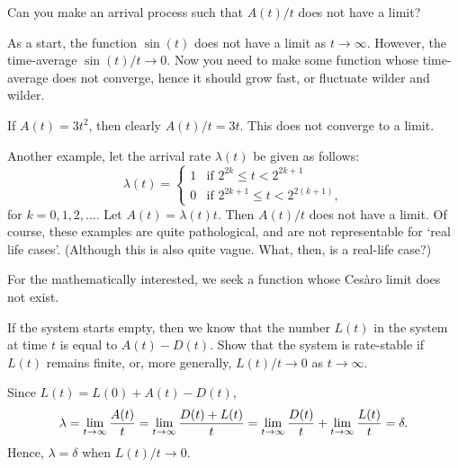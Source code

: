 \begin{exercise}
  Can you make an arrival process such that $A(t)/t$ does not have a limit?
\begin{hint}
  As a start, the function $\sin(t)$ does not have a limit as $t\to\infty$.
  However, the time-average $\sin(t)/t \to 0$.
  Now you need to make some function whose time-average does not converge, hence it should grow fast, or fluctuate wilder and wilder.
\end{hint}
\begin{solution}
 If $A(t) = 3 t^2$, then clearly $A(t)/t = 3t$. This does not
 converge to a limit.

 Another example, let the arrival rate $\lambda(t)$ be given as follows:
 \begin{equation*}
 \lambda(t) =
 \begin{cases}
 1 & \text{if } 2^{2k} \leq t < 2^{2k+1} \\
 0 & \text{if } 2^{2k+1} \leq t < 2^{2(k+1)},
 \end{cases}
 \end{equation*}
 for $k=0,1,2,\ldots$.
 Let $A(t) = \lambda(t) t$.
 Then $A(t)/t$ does not have a limit.
 Of course, these examples are quite pathological, and are not representable for `real life cases'.
 (Although this is also quite vague.
 What, then, is a real-life case?)

 For the mathematically interested, we seek a function whose Ces\`aro limit does not exist.
\end{solution}
\end{exercise}


\begin{exercise}\label{ex:98}
If the system starts empty, then we know that the number $L(t)$ in the system at time $t$ is equal to $A(t) - D(t)$.
Show that the system is rate-stable  if $L(t)$ remains finite, or, more generally, $L(t)/t \to 0$ as $t\to\infty$.
\begin{solution}
Since $L(t) = L(0) + A(t) - D(t)$,
\begin{equation*}
 \lambda = \lim_{t \to \infty} \frac{A(t)}t = \lim_{t \to \infty} \frac{D(t)+L(t)}t = \lim_{t \to \infty} \frac{D(t)}t + \lim_{t \to \infty} \frac{L(t)}t
 = \delta.
\end{equation*}
Hence, $\lambda=\delta$ when $L(t)/t\to0$.
\end{solution}
\end{exercise}




